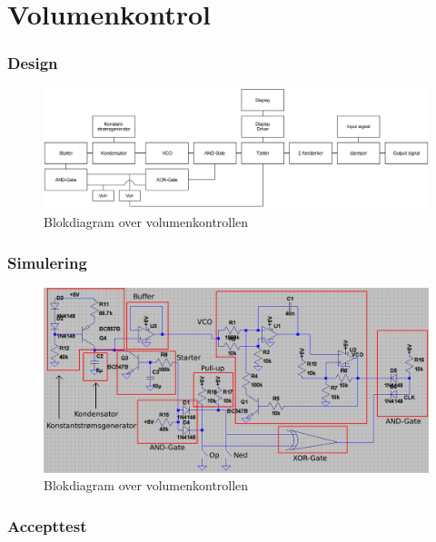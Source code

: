 \chapter{Volumenkontrol}
\label{volumenkontrol}

\subsection{Design}
\label{volumenkontrol-design}

\begin{figure}[h]
\centering
\includegraphics[width=\textwidth]{implementering/volumenkontrol/blokdiagram.png}
\caption{Blokdiagram over volumenkontrollen}
\label{fig:volumenkontrol_opbygning}
\end{figure}

\subsection{Simulering}
\label{volumenkontrol-simulering}

\begin{figure}[h]
\centering
\includegraphics[width=\textwidth]{implementering/volumenkontrol/diagram.png}
\caption{Blokdiagram over volumenkontrollen}
\label{fig:volumenkontrol_opbygning}
\end{figure}

\subsection{Accepttest}
\label{volumenkontrol-accepttest}
